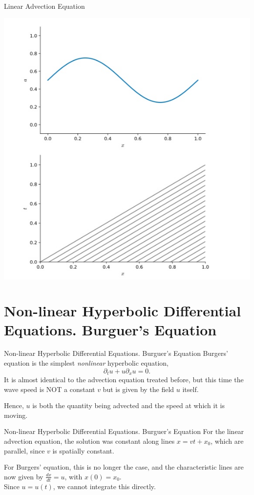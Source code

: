 \documentclass[11pt]{beamer}
\begin{document}
\begin{frame}[fragile]{Linear Advection Equation}
\begin{center}
\includegraphics[scale=0.3]{advectioncharact}
\end{center}
\end{frame}


\section{Non-linear Hyperbolic Differential Equations. Burguer's Equation }
\begin{frame}[fragile]{Non-linear Hyperbolic Differential Equations. Burguer's Equation }
Burgers' equation is the simplest {\em nonlinear} hyperbolic
equation,
\begin{equation}
\partial_t u + u \partial_x u = 0.
\end{equation}
It is almost identical to the advection equation treated before, but this time the wave speed is 
NOT a constant $v$ but is
given by the field $u$ itself. 
\bigskip

Hence, $u$ is both the quantity being advected and the speed at which
it is moving.
\end{frame}

\begin{frame}[fragile]{Non-linear Hyperbolic Differential Equations. Burguer's Equation }
For the linear advection equation, the solution was constant along lines $x = vt + x_0$, which are
parallel, since $v$ is spatially constant.  
\bigskip

For Burgers' equation,
this is no longer the case, and the characteristic lines are now
given by $\frac{dx}{dt} = u$, with $x(0) = x_0$.  \\

Since $u = u(t)$, we cannot integrate this directly.
\end{frame}
  
\end{document}
